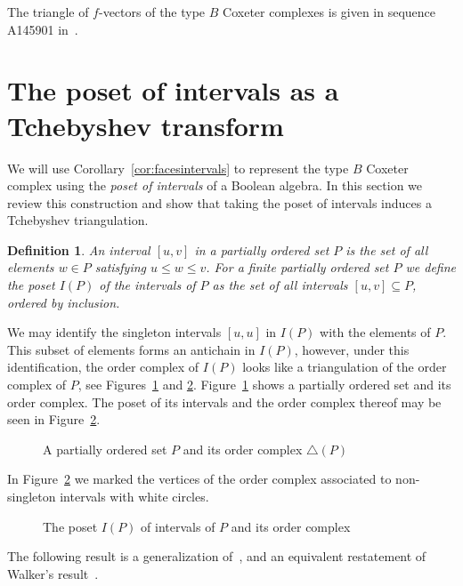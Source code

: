 \documentclass[reqno,12pt]{amsart}
\numberwithin{equation}{section}
\newtheorem{definition}[theorem]{Definition}
\newcommand{\0}{\widehat{0}}
\newcommand{\1}{\widehat{1}}
\newcommand{\2}{\widehat{2}}
\begin{document}
The triangle of $f$-vectors of the type $B$ Coxeter complexes is
given in sequence A145901 in~\cite{OEIS}.



\section{The poset of intervals as a Tchebyshev transform}
\label{sec:itcheb}

We will use Corollary~\ref{cor:facesintervals} to represent the type $B$
Coxeter complex using the {\em poset of intervals} of a Boolean
algebra. In this section we review this construction and show that
taking the poset of intervals induces a Tchebyshev triangulation. 

\begin{definition}
An {\em interval $[u,v]$} in a partially ordered set $P$ is the set of
all elements $w\in P$ satisfying $u\leq w\leq v$.    
For a finite partially ordered set $P$ we define the {\em poset $I(P)$
  of the intervals of $P$} as the set of all intervals $[u,v]\subseteq
  P$, ordered by inclusion.
\end{definition}  

We may identify the singleton intervals $[u,u]$ in $I(P)$ with the
elements of $P$. This subset of elements forms an antichain in $I(P)$,
however, under this identification, the order complex of $I(P)$ looks
like a triangulation of the order complex of $P$, see
Figures~\ref{fig:poset}  and \ref{fig:posett}. Figure~\ref{fig:poset}
shows a partially ordered set and its order complex. The poset of its
intervals and the order complex thereof may be seen in
Figure~\ref{fig:posett}.  

\begin{figure}[h]
  
\caption{A partially ordered set $P$ and its order complex $\triangle(P)$}  
\label{fig:poset}
\end{figure}  

In Figure~\ref{fig:posett} we marked the vertices of the order complex
associated to non-singleton intervals with white circles.

\begin{figure}[h]
  
\caption{The poset $I(P)$ of intervals of $P$ and its order complex}  
\label{fig:posett}
\end{figure}  

The following result is a generalization of~\cite[Remark 10]{Jojic}, and
an equivalent restatement of Walker's result~\cite[Theorem 4.1]{Walker}.
\end{document}
